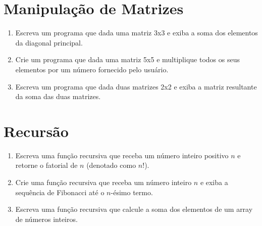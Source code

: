 \documentclass[a4paper, 12pt]{article}
\begin{document}
\section*{Manipulação de Matrizes}

\begin{enumerate}
    \item Escreva um programa que dada uma matriz 3x3 e exiba a soma dos elementos da diagonal principal.
    \item Crie um programa que dada uma matriz 5x5 e multiplique todos os seus elementos por um número fornecido pelo usuário.
    \item Escreva um programa que dada duas matrizes 2x2 e exiba a matriz resultante da soma das duas matrizes.
\end{enumerate}

\section*{Recursão}

\begin{enumerate}
    \item Escreva uma função recursiva que receba um número inteiro positivo \( n \) e retorne o fatorial de \( n \) (denotado como \( n! \)).
    \item Crie uma função recursiva que receba um número inteiro \( n \) e exiba a sequência de Fibonacci até o \( n \)-ésimo termo.
    \item Escreva uma função recursiva que calcule a soma dos elementos de um array de números inteiros.
\end{enumerate}
\end{document}
